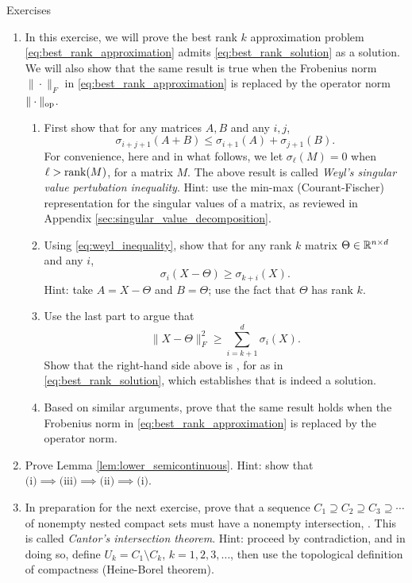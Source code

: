 \begin{xcb}{Exercises}
\begin{enumerate}[label=\thechapter.\arabic*]
\item In this exercise, we will prove the best rank $k$ approximation problem 
  \eqref{eq:best_rank_approximation} admits \eqref{eq:best_rank_solution} as a
  solution. We will also show that the same result is true when the Frobenius
  norm $\|\cdot\|_F$ in \eqref{eq:best_rank_approximation} is replaced by the 
  operator norm $\|\cdot\|_{\mathrm{op}}$. 

\begin{enumerate}[label=\alph*.]
\item First show that for any matrices $A,B$ and any $i,j$,
  \begin{equation}
  \label{eq:weyl_inequality}
  \sigma_{i+j+1}(A+B) \leq \sigma_{i+1}(A) + \sigma_{j+1}(B).
  \end{equation}
  For convenience, here and in what follows, we let $\sigma_\ell(M) = 0$ when   
  $\ell > \operatorname{rank}(M)$, for a matrix $M$. The above result is called \emph{Weyl's  
    singular value pertubation inequality}. Hint: use the min-max
  (Courant-Fischer) representation for the singular values of a matrix, as
  reviewed in Appendix \ref{sec:singular_value_decomposition}.

\item Using \eqref{eq:weyl_inequality}, show that for any rank $k$ matrix
  $\Theta \in \mathbb{R}^{n \times d}$ and any $i$, 
  \[
  \sigma_i(X - \Theta) \geq \sigma_{k+i}(X).
  \]
  Hint: take $A = X-\Theta$ and $B = \Theta$; use the fact that $\Theta$ has
  rank $k$. 

  \item Use the last part to argue that
  \[
  \|X - \Theta\|_F^2 \geq \sum_{i=k+1}^d \sigma_i(X).
  \]
  Show that the right-hand side above is , for
  \smash{$\hat\Theta$} as in \eqref{eq:best_rank_solution}, which establishes
  that \smash{$\hat\Theta$} is indeed a solution. 

\item Based on similar arguments, prove that the same result holds when the
  Frobenius norm in \eqref{eq:best_rank_approximation} is replaced by the
  operator norm. 
\end{enumerate}

\item Prove Lemma \ref{lem:lower_semicontinuous}. Hint: show that $\text{(i)}
    \implies \text{(iii)} \implies \text{(ii)} \implies \text{(i)}$.

\item \label{ex:cantor_intersection} 
  In preparation for the next exercise, prove that a sequence $C_1 \supseteq
  C_2 \supseteq C_3 \supseteq \cdots$ of nonempty nested compact sets must
  have a nonempty intersection, . This is called \emph{Cantor's intersection theorem}. Hint:
  proceed by contradiction, and in doing so, define $U_k =  C_1 \setminus C_k$,
  $k=1,2,3,\ldots$, then use the topological definition of compactness
  (Heine-Borel theorem).        


\end{enumerate}
\end{xcb}
